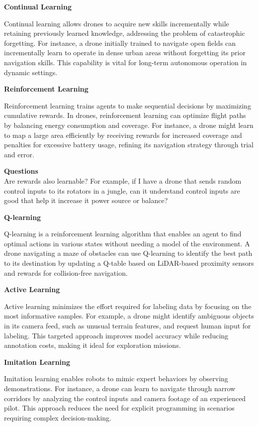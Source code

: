 \documentclass{book}
\providecommand{\ProjectDeepHeading}[2]{%
    \par\medskip\noindent\textbf{#2}\par\smallskip
}
\begin{document}
\ProjectDeepHeading{3}{Continual Learning}
Continual learning allows drones to acquire new skills incrementally while retaining previously learned knowledge, addressing the problem of catastrophic forgetting. For instance, a drone initially trained to navigate open fields can incrementally learn to operate in dense urban areas without forgetting its prior navigation skills. This capability is vital for long-term autonomous operation in dynamic settings. 

\ProjectDeepHeading{3}{Reinforcement Learning}
Reinforcement learning trains agents to make sequential decisions by maximizing cumulative rewards. In drones, reinforcement learning can optimize flight paths by balancing energy consumption and coverage. For instance, a drone might learn to map a large area efficiently by receiving rewards for increased coverage and penalties for excessive battery usage, refining its navigation strategy through trial and error. 

\textbf{Questions}
\\
Are rewards also learnable? For example, if I have a drone that sends random control inputs to its rotators in a jungle, can it understand control inputs are good that help it increase it power source or balance?

\ProjectDeepHeading{4}{Q-learning}
Q-learning is a reinforcement learning algorithm that enables an agent to find optimal actions in various states without needing a model of the environment. A drone navigating a maze of obstacles can use Q-learning to identify the best path to its destination by updating a Q-table based on LiDAR-based proximity sensors and rewards for collision-free navigation.

\ProjectDeepHeading{3}{Active Learning}
Active learning minimizes the effort required for labeling data by focusing on the most informative samples. For example, a drone might identify ambiguous objects in its camera feed, such as unusual terrain features, and request human input for labeling. This targeted approach improves model accuracy while reducing annotation costs, making it ideal for exploration missions.

\ProjectDeepHeading{3}{Imitation Learning}
Imitation learning enables robots to mimic expert behaviors by observing demonstrations. For instance, a drone can learn to navigate through narrow corridors by analyzing the control inputs and camera footage of an experienced pilot. This approach reduces the need for explicit programming in scenarios requiring complex decision-making. 
\end{document}
